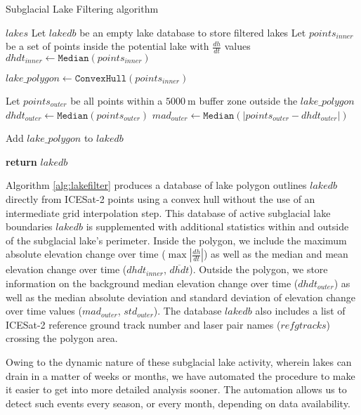 \begin{algorithm}
  \caption{Subglacial Lake Filtering algorithm}\label{alg:lakefilter}
  \begin{algorithmic}
      \Require $lakes$
      \State Let $lakedb$ be an empty lake database to store filtered lakes
        \State Let $points_{inner}$ be a set of points inside the potential lake with $\frac{dh}{dt}$ values
        \State $dhdt_{inner} \gets \texttt{Median}(points_{inner})$

        \State $lake\_polygon \gets \texttt{ConvexHull}(points_{inner})$

        \State Let $points_{outer}$ be all points within a $\SI{5000}{\metre}$ buffer zone outside the $lake\_polygon$
        \State $dhdt_{outer} \gets \texttt{Median}(points_{outer})$
        \State $mad_{outer} \gets \texttt{Median}(\lvert points_{outer} - dhdt_{outer} \rvert)$  %

          \State Add $lake\_polygon$ to $lakedb$
        \EndIf

      \EndFor
    \State \textbf{return} $lakedb$
  \end{algorithmic}
\end{algorithm}

Algorithm \ref{alg:lakefilter} produces a database of lake polygon outlines $lakedb$ directly from ICESat-2 points using a convex hull \citep{Barberquickhullalgorithmconvex1996} without the use of an intermediate grid interpolation step.
This database of active subglacial lake boundaries $lakedb$ is supplemented with additional statistics within and outside of the subglacial lake's perimeter.
Inside the polygon, we include the maximum absolute elevation change over time ($\max |\frac{dh}{dt}|$) as well as the median and mean elevation change over time ($dhdt_{inner}$, $\overline{dhdt}$).
Outside the polygon, we store information on the background median elevation change over time ($dhdt_{outer}$) as well as the median absolute deviation and standard deviation of elevation change over time values ($mad_{outer}$, $std_{outer}$).
The database $lakedb$ also includes a list of ICESat-2 reference ground track number and laser pair names ($refgtracks$) crossing the polygon area.

Owing to the dynamic nature of these subglacial lake activity, wherein lakes can drain in a matter of weeks or months, we have automated the procedure to make it easier to get into more detailed analysis sooner.
The automation allows us to detect such events every season, or every month, depending on data availability.

